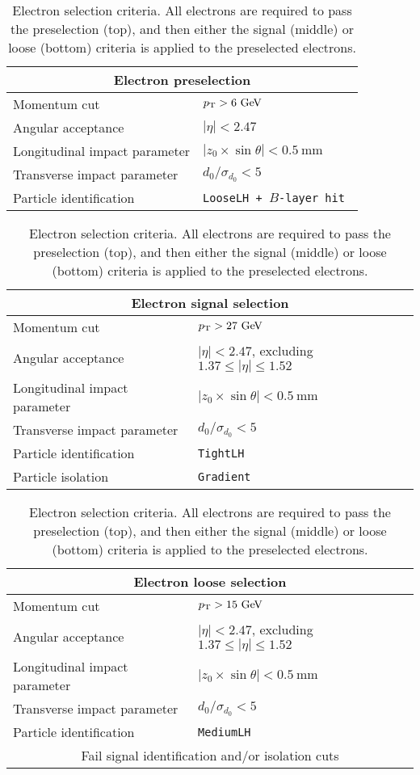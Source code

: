 \begin{table}[htbp]
  \centering
  \begin{tabular}{l l}
    \multicolumn{2}{c}{Electron preselection} \\ 
    \hline\hline
    Momentum cut                  & $\pt > 6\gev$ \\
    Angular acceptance            & $|\eta| < 2.47$ \\
    Longitudinal impact parameter & $|z_0\times\sin\theta| < 0.5~\textrm{mm}$ \\
    Transverse impact parameter   & $d_0/\sigma_{d_{0}} < 5$ \\
    Particle identification       & \tt{LooseLH} + $B$-layer hit \\
    \hline
  \end{tabular}

  \vspace{8mm}

  \begin{tabular}{l l}
    \multicolumn{2}{c}{Electron signal selection} \\ 
    \hline\hline
    Momentum cut                  & $\pt > 27\gev$ \\
    Angular acceptance            & $|\eta| < 2.47$, excluding $1.37 \le |\eta| \le 1.52$ \\
    Longitudinal impact parameter & $|z_0\times\sin\theta| < 0.5~\textrm{mm}$ \\
    Transverse impact parameter   & $d_0/\sigma_{d_{0}} < 5$ \\
    Particle identification       & \tt{TightLH} \\
    Particle isolation            & \tt{Gradient}\\
    \hline
  \end{tabular}

  \vspace{8mm}

  \begin{tabular}{l l}
    \multicolumn{2}{c}{Electron loose selection} \\ 
    \hline\hline
    Momentum cut                  & $\pt > 15\gev$ \\
    Angular acceptance            & $|\eta| < 2.47$, excluding $1.37 \le |\eta| \le 1.52$ \\
    Longitudinal impact parameter & $|z_0\times\sin\theta| < 0.5~\textrm{mm}$ \\
    Transverse impact parameter   & $d_0/\sigma_{d_{0}} < 5$ \\
    Particle identification       & \tt{MediumLH} \\
    \multicolumn{2}{c}{Fail signal identification and/or isolation cuts} \\
    \hline
  \end{tabular}
  \caption{Electron selection criteria.  All electrons are required to pass the preselection (top), and then either the signal (middle) or loose (bottom) criteria is applied to the preselected electrons.}
  \label{tab:ssww13tev_elec_selection}
\end{table}
